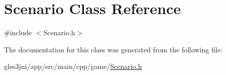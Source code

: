 \hypertarget{class_scenario}{}\section{Scenario Class Reference}
\label{class_scenario}


{\ttfamily \#include $<$Scenario.\+h$>$}



The documentation for this class was generated from the following file\+:\begin{DoxyCompactItemize}
\item 
gles3jni/app/src/main/cpp/game/\hyperlink{_scenario_8h}{Scenario.\+h}\end{DoxyCompactItemize}
